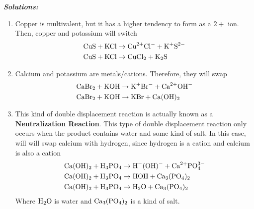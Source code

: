 \documentclass[12pt]{report}
\begin{document}
\begin{enumerate}
        \textit{\textbf{Solutions:}} 
        \begin{enumerate}[label=(\alph*)]
            \item{Copper is multivalent, but it has a higher tendency to form as a $2+$ ion. Then, copper and potassium will switch
        \begin{align*}
            \ce{CuS}+ \ce{KCl}&\to \text{Cu}^{2+} \text{Cl}^{-}+ \text{K}^{+} \text{S}^{2-}\\
            \ce{CuS}+ \ce{KCl}&\to \ce{CuCl2}+ \ce{K2S} 
        \end{align*}}
        \item{Calcium and potassium are metals/cations. Therefore, they will swap
                \begin{align*}
                    \ce{CaBr2}+ \ce{KOH}&\to \text{K}^{+} \text{Br}^{-}+ \text{Ca}^{2+} \text{OH}^{-}\\
                    \ce{CaBr2}+ \ce{KOH}&\to \ce{KBr}+ \ce{Ca(OH)2}
                \end{align*}}
        \item{This kind of double displacement reaction is actually known as a \textbf{Neutralization Reaction}. This type of double displacement reaction only occurs when the product contains water and some kind of salt. In this case, will will swap calcium with hydrogen, since hydrogen is a cation and calcium is also a cation
                \begin{align*}
                    \ce{Ca(OH)2}+ \ce{H3PO4}&\to \text{H}^{-} \text{(OH)}^{-}+ \text{Ca}^{2+} \text{PO}^{3-}_{4}\\
                    \ce{Ca(OH)2}+ \ce{H3PO4}&\to \ce{HOH}+ \ce{Ca3(PO4)2}\\
                    \ce{Ca(OH)2}+ \ce{H3PO4}&\to \ce{H2O}+ \ce{Ca3(PO4)2}\\
                \end{align*}
                Where $ \ce{H2O}$ is water and $ \ce{Ca3(PO4)2}$ is a kind of salt. 
            }
        \end{enumerate}
                
\end{enumerate}
\end{document}
